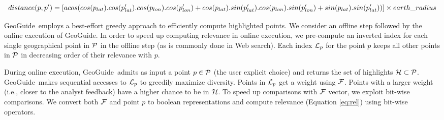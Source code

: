 \documentclass[conference,compsoc]{IEEEtran}
\newtheorem{problem}{Problem}
\newcommand{\framework}{{\sc GeoGuide}}
\newcommand{\pb}{{\sc GeoGuide}}
\begin{document}
\begin{dmath}
	\label{eq:harvestine}
	distance(p,p') = [ acos(cos(p_{lat}) . cos(p'_{lat}) . cos(p_{lon}) . cos(p'_{lon})\\ + cos(p_{lat}) . sin(p'_{lat}). cos(p_{lon}) . sin(p'_{lon}) + sin(p_{lat}) . sin(p'_{lat})) ] \times earth\_radius
\end{dmath}




\framework\ employs a best-effort greedy approach to efficiently compute highlighted points. We consider an offline step followed by the online execution of \framework.
In order to speed up computing relevance in online execution, we pre-compute an inverted index for each single geographical point in ${\cal P}$ in the offline step (as is commonly done in Web search). Each index ${\cal L}_p$ for the point $p$ keeps all other points in ${\cal P}$ in decreasing order of their relevance with $p$.

During online execution, \framework\ admits as input a point $p \in {\cal P}$ (the user explicit choice) and returns the set of highlights ${\cal H} \subset {\cal P}$. \framework\ makes sequential accesses to ${\cal L}_p$ to greedily maximize diversity. Points in ${\cal L}_p$ get a weight using ${\cal F}$. Points with a larger weight (i.e., closer to the analyst feedback) have a higher chance to be in ${\cal H}$. To speed up comparisons with ${\cal F}$ vector, we exploit bit-wise comparisons. We convert both ${\cal F}$ and point $p$ to boolean representations and compute relevance (Equation \ref{eq:rel}) using bit-wise operators.
\end{document}

